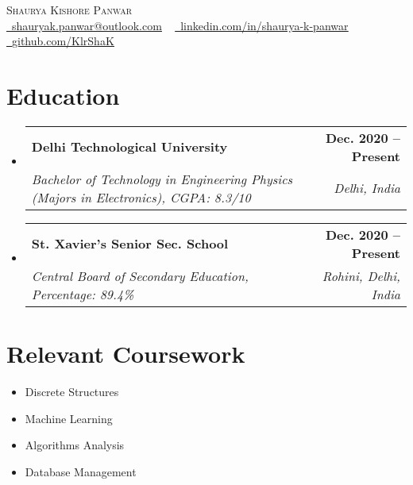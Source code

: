 \documentclass[letterpaper,11pt]{article}
\makeatletter
\newcommand{\resumeSubheading}[4]{
  \vspace{-2pt}\item
    \begin{tabular*}{1.0\textwidth}[t]{l@{\extracolsep{\fill}}r}
      \textbf{#1} & \textbf{\small #2} \\
      \textit{\small#3} & \textit{\small #4} \\
    \end{tabular*}\vspace{-7pt}
}
\newcommand{\resumeSubHeadingListStart}{\begin{itemize}[leftmargin=0.0in, label={}]}
\newcommand{\resumeSubHeadingListEnd}{\end{itemize}}
\makeatother
\begin{document}

\begin{center}
    {\Huge \scshape Shaurya Kishore Panwar} \\ \vspace{1pt}
     \href{mailto:mail.com}{\raisebox{-0.2\height}\faEnvelope\  \underline{shauryak.panwar@outlook.com}} ~ 
    \href{https://linkedin.com/in//}{\raisebox{-0.2\height}\faLinkedin\ \underline{linkedin.com/in/shaurya-k-panwar}}  ~
    \href{https://github.com/}{\raisebox{-0.2\height}\faGithub\ \underline{github.com/KlrShaK}}
    \vspace{-8pt}
\end{center}


\section{Education}
  \resumeSubHeadingListStart
    \resumeSubheading
      {Delhi Technological University}{Dec. 2020 -- Present}
      {Bachelor of Technology in Engineering Physics (Majors in Electronics), CGPA: 8.3/10}{Delhi, India}
    \resumeSubheading
      {St. Xavier's Senior Sec. School}{Dec. 2020 -- Present}
      {Central Board of Secondary Education, Percentage: 89.4\%}{Rohini, Delhi, India}
  \resumeSubHeadingListEnd

\section{Relevant Coursework}
        \begin{multicols}{4}
            \begin{itemize}[itemsep=-5pt, parsep=3pt]
                \item\small Discrete Structures
                \item Machine Learning
                \item Algorithms Analysis
                \item Database Management
            \end{itemize}
        \end{multicols}
        \vspace*{2.0\multicolsep}
\end{document}
